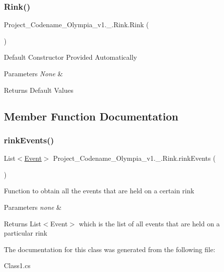 \subsubsection{\texorpdfstring{Rink()}{Rink()}}
{\footnotesize\ttfamily Project\+\_\+\+Codename\+\_\+\+Olympia\+\_\+v1.\+\_.\+Rink.\+Rink (\begin{DoxyParamCaption}{ }\end{DoxyParamCaption})\hspace{0.3cm}{\ttfamily [inline]}}

Default Constructor Provided Automatically 
\begin{DoxyParams}{Parameters}
{\em None} & \\
\hline
\end{DoxyParams}
\begin{DoxyReturn}{Returns}
Default Values 
\end{DoxyReturn}


\subsection{Member Function Documentation}
\mbox{\label{classProject__Codename__Olympia__v1_1_1__0_1_1Rink_a79363adae7214d4718bd0e6c6dde7258}} 
\subsubsection{\texorpdfstring{rink\+Events()}{rinkEvents()}}
{\footnotesize\ttfamily List$<$\hyperlink{classProject__Codename__Olympia__v1_1_1__0_1_1Event}{Event}$>$ Project\+\_\+\+Codename\+\_\+\+Olympia\+\_\+v1.\+\_.\+Rink.\+rink\+Events (\begin{DoxyParamCaption}{ }\end{DoxyParamCaption})\hspace{0.3cm}{\ttfamily [inline]}}

Function to obtain all the events that are held on a certain rink 
\begin{DoxyParams}{Parameters}
{\em none} & \\
\hline
\end{DoxyParams}
\begin{DoxyReturn}{Returns}
List$<$\+Event$>$ which is the list of all events that are held on a particular rink 
\end{DoxyReturn}


The documentation for this class was generated from the following file\+:\begin{DoxyCompactItemize}
\item 
Class1.\+cs\end{DoxyCompactItemize}
